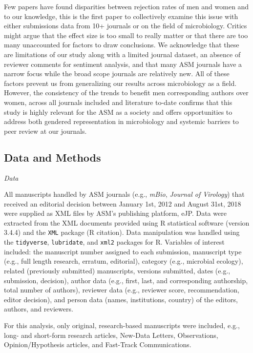 \documentclass[11pt,]{article}
\begin{document}
Few papers have found disparities between rejection rates of men and
women and to our knowledge, this is the first paper to collectively
examine this issue with either submissions data from 10+ journals or on
the field of microbiology. Critics might argue that the effect size is
too small to really matter or that there are too many unaccounted for
factors to draw conclusions. We acknowledge that these are limitations
of our study along with a limited journal dataset, an absence of
reviewer comments for sentiment analysis, and that many ASM journals
have a narrow focus while the broad scope journals are relatively new.
All of these factors prevent us from generalizing our results across
microbiology as a field. However, the consistency of the trends to
benefit men corresponding authors over women, across all journals
included and literature to-date confirms that this study is highly
relevant for the ASM as a society and offers opportunities to address
both gendered representation in microbiology and systemic barriers to
peer review at our journals.

\subsection{Data and Methods}\label{data-and-methods}

\emph{Data}

All manuscripts handled by ASM journals (e.g., \emph{mBio},
\emph{Journal of Virology}) that received an editorial decision between
January 1st, 2012 and August 31st, 2018 were supplied as XML files by
ASM's publishing platform, eJP. Data were extracted from the XML
documents provided using R statistical software (version 3.4.4) and the
\texttt{XML} package (R citation). Data manipulation was handled using
the \texttt{tidyverse}, \texttt{lubridate}, and \texttt{xml2} packages
for R. Variables of interest included: the manuscript number assigned to
each submission, manuscript type (e.g., full length research, erratum,
editorial), category (e.g., microbial ecology), related (previously
submitted) manuscripts, versions submitted, dates (e.g., submission,
decision), author data (e.g., first, last, and corresponding authorship,
total number of authors), reviewer data (e.g., reviewer score,
recommendation, editor decision), and person data (names, institutions,
country) of the editors, authors, and reviewers.

For this analysis, only original, research-based manuscripts were
included, e.g., long- and short-form research articles, New-Data
Letters, Observations, Opinion/Hypothesis articles, and Fast-Track
Communications.
\end{document}

